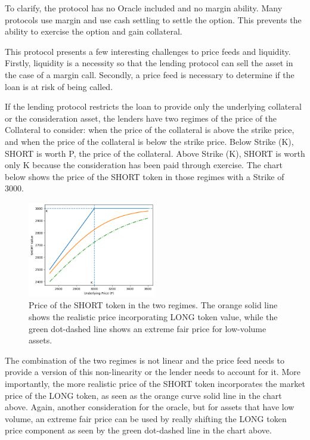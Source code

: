 To clarify, the protocol has no Oracle included and no margin ability. 
Many protocols use margin and use cash settling to settle the option.
This prevents the ability to exercise the option and gain collateral.

This protocol presents a few interesting challenges to price feeds and liquidity. 
Firstly, liquidity is a necessity so that the lending protocol can sell the asset in the case of a margin call.
Secondly, a price feed is necessary to determine if the loan is at risk of being called.

If the lending protocol restricts the loan to provide only the underlying collateral or the consideration asset,
the lenders have two regimes of the price of the Collateral to consider: 
when the price of the collateral is above the strike price, and when the price of the collateral is below the strike price.
Below Strike (K), SHORT is worth P, the price of the collateral. 
Above Strike (K), SHORT is worth only K because the consideration has been paid through exercise.
The chart below shows the price of the SHORT token in those regimes with a Strike of 3000.
\begin{figure}[h]
  \centering
  \includegraphics[width=0.5\textwidth]{short_price.png}
  \caption{Price of the SHORT token in the two regimes. The orange solid line shows the realistic price incorporating LONG token value, while the green dot-dashed line shows an extreme fair price for low-volume assets.}
  \label{fig:short_price}
\end{figure}

The combination of the two regimes is not linear and the price feed needs to provide a version of this non-linearity or the lender needs to account for it.
More importantly, the more realistic price of the SHORT token incorporates the market price of the LONG token, as seen as the orange curve solid line in the chart above.
Again, another consideration for the oracle, but for assets that have low volume, an extreme fair price can be used by really shifting the LONG token price component as seen by the green dot-dashed line in the chart above.

